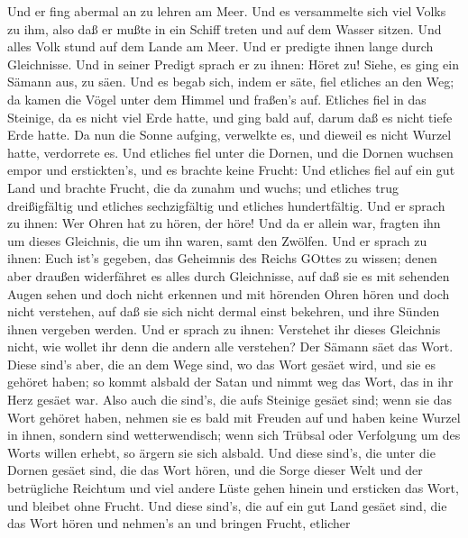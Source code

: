  Und er fing abermal an zu lehren am Meer. Und es
versammelte sich viel Volks zu ihm, also daß er mußte in ein Schiff
treten und auf dem Wasser sitzen. Und alles Volk stund auf dem Lande am
Meer.  Und er predigte ihnen lange durch Gleichnisse. Und in
seiner Predigt sprach er zu ihnen:  Höret zu! Siehe, es ging
ein Sämann aus, zu säen.  Und es begab sich, indem er säte,
fiel etliches an den Weg; da kamen die Vögel unter dem Himmel und
fraßen's auf.  Etliches fiel in das Steinige, da es nicht
viel Erde hatte, und ging bald auf, darum daß es nicht tiefe Erde hatte.
 Da nun die Sonne aufging, verwelkte es, und dieweil es
nicht Wurzel hatte, verdorrete es.  Und etliches fiel unter
die Dornen, und die Dornen wuchsen empor und erstickten's, und es
brachte keine Frucht:  Und etliches fiel auf ein gut Land
und brachte Frucht, die da zunahm und wuchs; und etliches trug
dreißigfältig und etliches sechzigfältig und etliches hundertfältig.
 Und er sprach zu ihnen: Wer Ohren hat zu hören, der höre!
 Und da er allein war, fragten ihn um dieses Gleichnis, die
um ihn waren, samt den Zwölfen.  Und er sprach zu ihnen:
Euch ist's gegeben, das Geheimnis des Reichs GOttes zu wissen; denen
aber draußen widerfähret es alles durch Gleichnisse,  auf
daß sie es mit sehenden Augen sehen und doch nicht erkennen und mit
hörenden Ohren hören und doch nicht verstehen, auf daß sie sich nicht
dermal einst bekehren, und ihre Sünden ihnen vergeben werden.
 Und er sprach zu ihnen: Verstehet ihr dieses Gleichnis
nicht, wie wollet ihr denn die andern alle verstehen?  Der
Sämann säet das Wort.  Diese sind's aber, die an dem Wege
sind, wo das Wort gesäet wird, und sie es gehöret haben; so kommt
alsbald der Satan und nimmt weg das Wort, das in ihr Herz gesäet war.
 Also auch die sind's, die aufs Steinige gesäet sind; wenn
sie das Wort gehöret haben, nehmen sie es bald mit Freuden auf
 und haben keine Wurzel in ihnen, sondern sind
wetterwendisch; wenn sich Trübsal oder Verfolgung um des Worts willen
erhebt, so ärgern sie sich alsbald.  Und diese sind's, die
unter die Dornen gesäet sind, die das Wort hören,  und die
Sorge dieser Welt und der betrügliche Reichtum und viel andere Lüste
gehen hinein und ersticken das Wort, und bleibet ohne Frucht.
 Und diese sind's, die auf ein gut Land gesäet sind, die
das Wort hören und nehmen's an und bringen Frucht, etlicher

